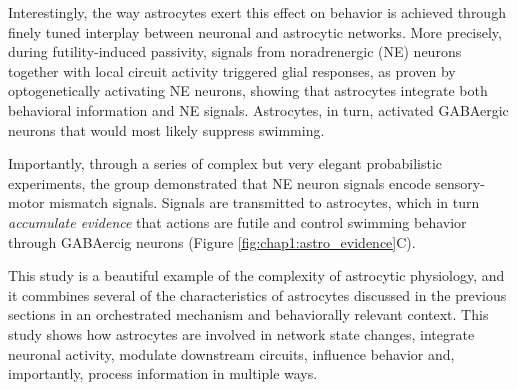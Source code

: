 Interestingly, the way astrocytes exert this effect on behavior is achieved through finely tuned interplay between neuronal and astrocytic networks. 
More precisely, during futility-induced passivity, signals from noradrenergic (NE) neurons together with local circuit activity triggered glial responses, as proven by optogenetically activating NE neurons, showing that astrocytes integrate both behavioral information and NE signals.
Astrocytes, in turn, activated GABAergic neurons that would most likely suppress swimming. 

Importantly, through a series of complex but very elegant probabilistic experiments, the group demonstrated that NE neuron signals encode sensory-motor mismatch signals.
Signals are transmitted to astrocytes, which in turn \textit{accumulate evidence} that actions are futile and control swimming behavior through GABAercig neurons (Figure \ref{fig:chap1:astro_evidence}C). 

This study is a beautiful example of the complexity of astrocytic physiology, and it commbines several of the characteristics of astrocytes discussed in the previous sections in an orchestrated mechanism and behaviorally relevant context. 
This study shows how astrocytes are involved in network state changes, integrate neuronal activity, modulate downstream circuits, influence behavior and, importantly, process information in multiple ways.  

